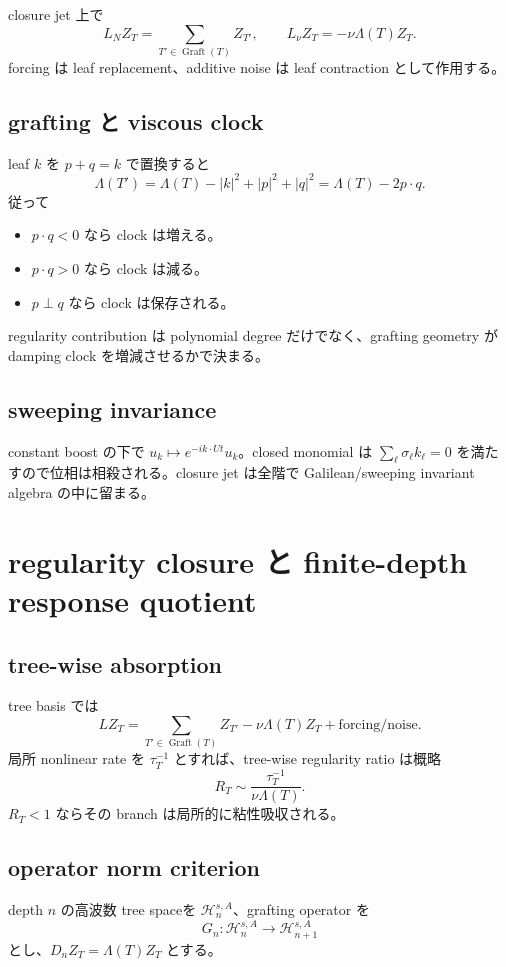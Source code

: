 \documentclass[11pt,a4paper,openany]{book}
\numberwithin{equation}{chapter}
\newcommand{\cH}{\mathcal H}
\begin{document}
closure jet 上で
\[
L_NZ_T=\sum_{T'\in\operatorname{Graft}(T)}Z_{T'},
\qquad
L_\nu Z_T=-\nu\Lambda(T)Z_T.
\]
forcing は leaf replacement、additive noise は leaf contraction として作用する。

\section{grafting と viscous clock}
leaf $k$ を $p+q=k$ で置換すると
\[
\Lambda(T')
=\Lambda(T)-|k|^2+|p|^2+|q|^2
=\Lambda(T)-2p\cdot q.
\]
従って
\begin{itemize}
\item $p\cdot q<0$ なら clock は増える。
\item $p\cdot q>0$ なら clock は減る。
\item $p\perp q$ なら clock は保存される。
\end{itemize}
regularity contribution は polynomial degree だけでなく、grafting geometry が damping clock を増減させるかで決まる。

\section{sweeping invariance}
constant boost の下で $u_k\mapsto e^{-ik\cdot Ut}u_k$。closed monomial は $\sum_\ell\sigma_\ell k_\ell=0$ を満たすので位相は相殺される。closure jet は全階で Galilean/sweeping invariant algebra の中に留まる。

\chapter{regularity closure と finite-depth response quotient}
\section{tree-wise absorption}
tree basis では
\[
LZ_T
=\sum_{T'\in\operatorname{Graft}(T)}Z_{T'}
-\nu\Lambda(T)Z_T
+\text{forcing/noise}.
\]
局所 nonlinear rate を $\tau_T^{-1}$ とすれば、tree-wise regularity ratio は概略
\[
R_T\sim\frac{\tau_T^{-1}}{\nu\Lambda(T)}.
\]
$R_T<1$ ならその branch は局所的に粘性吸収される。

\section{operator norm criterion}
depth $n$ の高波数 tree spaceを $\cH_{n}^{s,A}$、grafting operator を
\[
G_n:\cH_n^{s,A}\to\cH_{n+1}^{s,A}
\]
とし、$D_nZ_T=\Lambda(T)Z_T$ とする。
\end{document}
